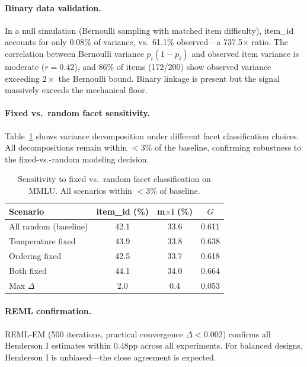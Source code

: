\documentclass[11pt,a4paper]{article}
\newcommand{\Gcoeff}{\ensuremath{G}}
\begin{document}
\paragraph{Binary data validation.}
In a null simulation (Bernoulli sampling with matched item difficulty), item\_id accounts for only 0.08\% of variance, vs.\ 61.1\% observed---a 737.5$\times$ ratio.
The correlation between Bernoulli variance $p_i(1-p_i)$ and observed item variance is moderate ($r=0.42$), and 86\% of items (172/200) show observed variance exceeding $2\times$ the Bernoulli bound.
Binary linkage is present but the signal massively exceeds the mechanical floor.

\paragraph{Fixed vs.\ random facet sensitivity.}
Table~\ref{tab:fixedrandom} shows variance decomposition under different facet classification choices.
All decompositions remain within $<$3\% of the baseline, confirming robustness to the fixed-vs.-random modeling decision.

\begin{table}[t]
\centering
\caption{Sensitivity to fixed vs.\ random facet classification on MMLU. All scenarios within $<$3\% of baseline.}
\label{tab:fixedrandom}
\small
\begin{tabular}{lccc}
\toprule
\textbf{Scenario} & \textbf{item\_id (\%)} & \textbf{m$\times$i (\%)} & \textbf{$\Gcoeff$} \\
\midrule
All random (baseline) & 42.1 & 33.6 & 0.611 \\
Temperature fixed     & 43.9 & 33.8 & 0.638 \\
Ordering fixed        & 42.5 & 33.7 & 0.618 \\
Both fixed            & 44.1 & 34.0 & 0.664 \\
\midrule
Max $\Delta$          &  2.0 &  0.4 & 0.053 \\
\bottomrule
\end{tabular}
\end{table}

\paragraph{REML confirmation.}
REML-EM (500 iterations, practical convergence $\Delta<0.002$) confirms all Henderson I estimates within 0.48pp across all experiments.
For balanced designs, Henderson I is unbiased---the close agreement is expected.
\end{document}
